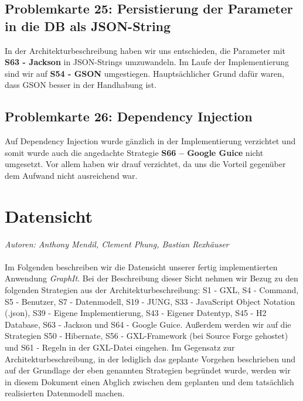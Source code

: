 \documentclass[enabledeprecatedfontcommands,fontsize=11pt,paper=a4,twoside]{scrartcl}
\begin{document}
\subsection{Problemkarte 25: Persistierung der Parameter in die DB als JSON-String}
In der Architekturbeschreibung haben wir uns entschieden, die Parameter mit \textbf{S63 - Jackson} in JSON-Strings umzuwandeln. Im Laufe der Implementierung sind wir auf \textbf{S54 - GSON} umgestiegen. Hauptsächlicher Grund dafür waren, dass GSON besser in der Handhabung ist. \\


\subsection{Problemkarte 26: Dependency Injection}
Auf Dependency Injection wurde gänzlich in der Implementierung verzichtet und somit wurde auch die angedachte Strategie \textbf{S66 – Google Guice} nicht umgesetzt. Vor allem haben wir drauf verzichtet, da uns die Vorteil gegenüber dem Aufwand nicht ausreichend war. \\


\newpage
\section{Datensicht}
\label{sec:datensicht}

\emph{Autoren: Anthony Mendil, Clement Phung, Bastian Rexhäuser}\\ \\
Im Folgenden beschreiben wir die Datensicht unserer fertig implementierten Anwendung \textit{GraphIt}. Bei der Beschreibung dieser Sicht nehmen wir Bezug zu den folgenden Strategien aus der Architekturbeschreibung: S1 - GXL, S4 - Command, S5 - Benutzer, S7 - Datenmodell, S19 - JUNG, S33 - JavaScript Object Notation (.json), S39 - Eigene Implementierung, S43 - Eigener Datentyp, S45 - H2 Database, S63 - Jackson und S64 - Google Guice. Außerdem werden wir auf die Strategien S50 - Hibernate, S56 - GXL-Framework (bei Source Forge gehostet) und S61 - Regeln in der GXL-Datei eingehen. Im Gegensatz zur Architekturbeschreibung, in der lediglich das geplante Vorgehen beschrieben und auf der Grundlage der eben genannten Strategien begründet wurde, werden wir in diesem Dokument einen Abglich zwischen dem geplanten und dem tatsächlich realisierten Datenmodell machen. \\
\end{document}
